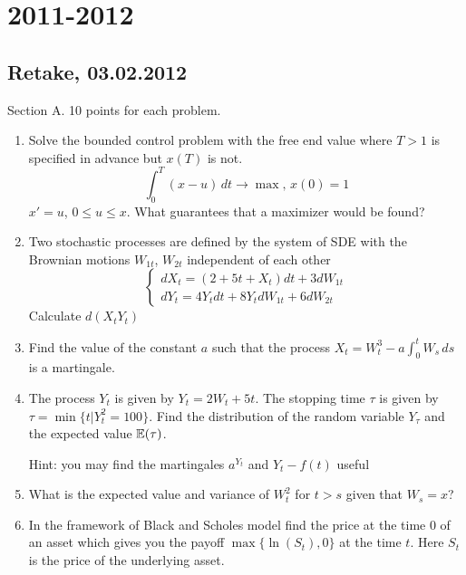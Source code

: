 \documentclass[pdftex,12pt,a4paper]{article}
\begin{document}
\section{2011-2012}

\subsection{Retake, 03.02.2012}

Section A.  10 points for each problem.

\begin{enumerate}
\item Solve the bounded control problem with the free end value where $T>1$ is specified in advance but $x(T)$ is not.
\begin{equation}
\int_0^T(x-u)\,dt\to \max,\, x(0)=1 \nonumber
\end{equation}
$x'=u$, $0\leq u\leq x$. What guarantees that a maximizer would be found?

\item Two stochastic processes are defined by the system of SDE with the Brownian motions $W_{1t}$, $W_{2t}$ independent of each other
\begin{equation}
\begin{cases}
dX_t=(2+5t+X_t)dt+3dW_{1t} \\
dY_t=4Y_t dt+8Y_t dW_{1t}+6dW_{2t} \nonumber
\end{cases}
\end{equation}
Calculate $d(X_t Y_t)$

\item Find the value of the constant $a$ such that the process $X_t=W_t^3-a\int_0^t W_s\,ds$ is a martingale.

\item The process $Y_t$ is given by $Y_t=2W_t+5t$. The stopping time $\tau$ is given by $\tau=\min\{t|Y_t^2=100\}$. Find the distribution of the random variable $Y_\tau$ and the expected value $\mathbb{E}(\tau)$.


Hint: you may find the martingales $a^{Y_t}$ and $Y_t-f(t)$ useful

\item What is the expected value and variance of $W_t^2$ for $t>s$ given that $W_s=x$?

\item In the framework of Black and Scholes model find the price at the time $0$ of an asset which gives you the payoff $\max\{\ln(S_t),0\}$ at the time $t$. Here $S_t$ is the price of the underlying asset.
\end{enumerate}
\end{document}
